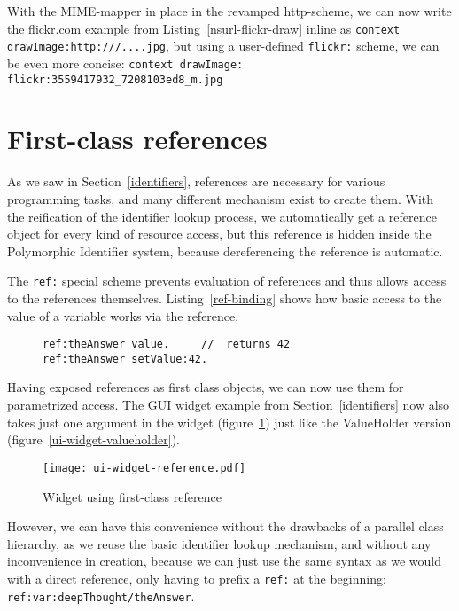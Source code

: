 \documentclass[preprint,authoryear]{llncs}
\begin{document}
With the MIME-mapper in place in the revamped http-scheme, we can now 
write the flickr.com example from Listing~\ref{nsurl-flickr-draw} inline as {\tt context drawImage:http:///....jpg},
but using a user-defined {\tt flickr:} scheme, we can be even more concise:  
{\tt context drawImage: flickr:3559417932\_7208103ed8\_m.jpg}


\section{First-class references}
\label{references}

As we saw in Section~\ref{identifiers}, references are necessary for various programming tasks,
and many different mechanism exist to create them.   With the reification of the identifier lookup
process, we automatically get a reference object for every kind of resource access, but this
reference is hidden inside the Polymorphic Identifier system, because dereferencing the
reference is automatic.

The {\tt ref:} special scheme prevents evaluation of references and thus allows access
to the references themselves.  Listing~\ref{ref-binding} shows how basic access to
the value of a variable works via the reference.


\begin{figure}[htbp]
\begin{lstlisting}[style=numbers,label=ref-binding,caption=Retrieve and store value via its reference.]
ref:theAnswer value.     //  returns 42
ref:theAnswer setValue:42.  
\end{lstlisting}
\end{figure}

Having exposed references as first class objects, we can now use them for parametrized 
access.  The GUI widget example from Section~\ref{identifiers} now
also takes just one argument in the widget (figure~\ref{ui-widget-reference}) just like
the ValueHolder version (figure~\ref{ui-widget-valueholder}).

\begin{figure}[htbp]
\centering
\texttt{[image: ui-widget-reference.pdf]}
\caption{Widget using first-class reference}
\label{ui-widget-reference}

\end{figure}

However, we can have this convenience without the drawbacks of a parallel class
hierarchy, as we reuse the basic identifier lookup mechanism, and without any
inconvenience in creation, because we can just use the same syntax as we would
with a direct reference, only having to prefix a {\tt ref:} at the beginning:  {\tt ref:var:deepThought/theAnswer}.
\end{document}
